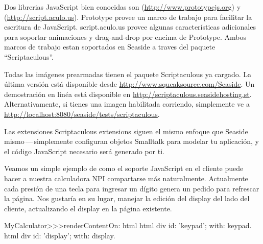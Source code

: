 \documentclass[a4paper,10pt,twoside]{book}
\begin{document}
Dos librerias JavaScript bien conocidas son  (\url{http://www.prototypejs.org}) y  (\url{http://script.aculo.us}).
Prototype provee un marco de trabajo para facilitar la escritura de JavaScript.
script.aculo.us provee algunas caracter\'isticas adicionales para soportar animaciones y drag-and-drop por encima de Prototype.
Ambos marcos de trabajo estan soportados en Seaside a traves del paquete ``Scriptaculous''.

Todas las im\'agenes prearmadas tienen el paquete Scriptaculous ya cargado.
La \'ultima versi\'on est\'a disponible desde \url{http://www.squeaksource.com/Seaside}.
Un demostraci\'on en lin\'ea est\'a disponible en \url{http://scriptaculous.seasidehosting.st}.
Alternativamente, si tienes una imagen habilitada corriendo, simplemente ve a \url{http://localhost:8080/seaside/tests/scriptaculous}.

Las extensiones Scriptaculous extensions siguen el mismo enfoque que Seaside mismo\,---\,simplemente configuran objetos Smalltalk para modelar tu aplicaci\'on, y el c\'odigo JavaScript
necesario ser\'a generado por ti.


Veamos un simple ejemplo de como el soporte JavaScript en el cliente puede hacer a nuestra calculadora NPI compartarse m\'as naturalmente.
Actualmente cada presi\'on de una tecla para ingresar un d\'igito genera un pedido para refrescar la p\'agina.
Nos gustar\'ia en su lugar, manejar la edici\'on del display del lado del cliente, actualizando el display en la p\'agina existente.


\begin{code}{}
MyCalculator>>>renderContentOn: html
	html div id: 'keypad'; with: keypad.
	html div id: 'display'; with: display.	
\end{code}
				
\end{document}
